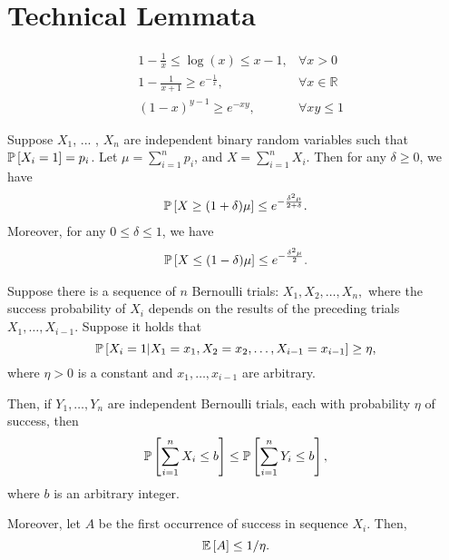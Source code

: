\section{Technical Lemmata}\label{apx:tech}

\begin{lemma}\label{lemma:val-inq}
    \begin{align*}
        & 1-\frac{1}{x}\le \log(x) \le x-1, &\forall x>0\\
        & 1-\frac{1}{x+1}\ge e^{-\frac{1}{x}} , &\forall x\in \mathbb{R}\\
        & (1-x)^{y-1}\ge e^{-xy}, &\forall xy \le 1
    \end{align*}
\end{lemma}

\begin{lemma}\label{lemma:chernoff}
    Suppose $X_1$, ... , $X_n$ are independent binary random variables such that 
    $\mathbb{P} \left[ X_i = 1 \right] = p_i$. Let $\mu = \sum_{i=1}^n p_i$, and 
    $X = \sum_{i=1}^n X_i$. Then for any $\delta \geq 0$, we have
    \begin{align}
        \mathbb{P} \left[ X \ge (1+\delta)\mu \right] \le e^{-\frac{\delta^2 \mu}{2+\delta}}.
    \end{align}
    Moreover, for any $0 \leq \delta \leq 1$, we have
    \begin{align}
        \mathbb{P} \left[ X \le (1-\delta)\mu \right] \le e^{-\frac{\delta^2 \mu}{2}}.
    \end{align}
\end{lemma}
\begin{lemma} \label{lemma:indep}
    Suppose there is a sequence of $n$ Bernoulli trials:
    $X_1, X_2, \ldots, X_n,$
    where the success probability of $X_i$
    depends on the results of
    the preceding trials $X_1, \ldots, X_{i-1}$.
    Suppose it holds that $$\mathbb{P} \left[ X_i = 1 | X_1 = x_1, X_2 = x_2, \ldots, X_{i-1} = x_{i-1}  \right] \ge \eta,$$ where $\eta > 0$ is a constant and $x_1,\ldots,x_{i-1}$ are arbitrary.
  
    Then, if $Y_1,\ldots, Y_n$ are independent Bernoulli trials, each with probability $\eta$ of
    success, then $$\mathbb{P} \left[ \sum_{i = 1}^n X_i \le b  \right] \le \mathbb{P} \left[ \sum_{i = 1}^n Y_i \le b  \right], $$
    where $b$ is an arbitrary integer.
  
    Moreover, let $A$ be the first occurrence of success in sequence $X_i$.
    Then, $$\mathbb{E}\left[ A \right] \le 1/\eta.$$
\end{lemma}

